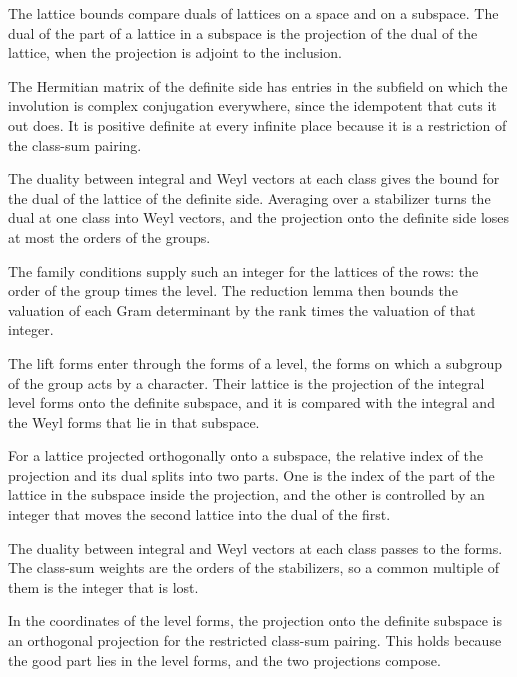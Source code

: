 The lattice bounds compare duals of lattices on a space and on a subspace.
The dual of the part of a lattice in a subspace is the projection of the dual
of the lattice, when the projection is adjoint to the inclusion.

The Hermitian matrix of the definite side has entries in the subfield on which
the involution is complex conjugation everywhere, since the idempotent that cuts
it out does. It is positive definite at every infinite place because it is a
restriction of the class-sum pairing.

The duality between integral and Weyl vectors at each class gives the bound
for the dual of the lattice of the definite side. Averaging over a stabilizer
turns the dual at one class into Weyl vectors, and the projection onto the
definite side loses at most the orders of the groups.

The family conditions supply such an integer for the lattices of the rows: the
order of the group times the level. The reduction lemma then bounds the
valuation of each Gram determinant by the rank times the valuation of that
integer.

The lift forms enter through the forms of a level, the forms on which a
subgroup of the group acts by a character. Their lattice is the projection of
the integral level forms onto the definite subspace, and it is compared with the
integral and the Weyl forms that lie in that subspace.

For a lattice projected orthogonally onto a subspace, the relative index of the
projection and its dual splits into two parts. One is the index of the part of
the lattice in the subspace inside the projection, and the other is controlled by
an integer that moves the second lattice into the dual of the first.

The duality between integral and Weyl vectors at each class passes to the
forms. The class-sum weights are the orders of the stabilizers, so a common
multiple of them is the integer that is lost.

In the coordinates of the level forms, the projection onto the definite
subspace is an orthogonal projection for the restricted class-sum pairing. This
holds because the good part lies in the level forms, and the two projections
compose.

